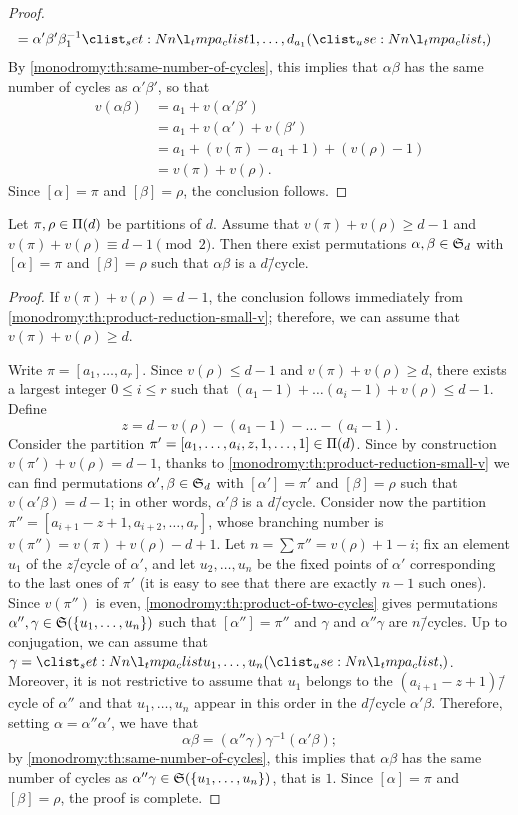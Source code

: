\begin{proof}
\begin{align*}
&=\alpha'\beta'\beta_1^{-1}\cycle{1,\ldots,d_{a_1}}
\end{align*}
By \cref{monodromy:th:same-number-of-cycles}, this implies that $\alpha\beta$ has the same number of cycles as $\alpha'\beta'$, so that
\begin{align*}
v(\alpha\beta)&=a_1+v(\alpha'\beta')\\
&=a_1+v(\alpha')+v(\beta')\\
&=a_1+(v(\pi)-a_1+1)+(v(\rho)-1)\\
&=v(\pi)+v(\rho).
\end{align*}
Since $[\alpha]=\pi$ and $[\beta]=\rho$, the conclusion follows.
\end{proof}

\begin{proposition}\label{monodromy:th:product-reduction-odd}
Let $\pi,\rho\in\Pi(d)$ be partitions of $d$. Assume that $v(\pi)+v(\rho)\ge d-1$ and $v(\pi)+v(\rho)\equiv d-1\pmod{2}$. Then there exist permutations $\alpha,\beta\in\symgroup[d]$ with $[\alpha]=\pi$ and $[\beta]=\rho$ such that $\alpha\beta$ is a $d$\=/cycle.
\end{proposition}
\begin{proof}
If $v(\pi)+v(\rho)=d-1$, the conclusion follows immediately from \cref{monodromy:th:product-reduction-small-v}; therefore, we can assume that $v(\pi)+v(\rho)\ge d$.

Write $\pi=[a_1,\ldots,a_r]$. Since $v(\rho)\le d-1$ and $v(\pi)+v(\rho)\ge d$, there exists a largest integer $0\le i\le r$ such that $(a_1-1)+\ldots(a_i-1)+v(\rho)\le d-1$. Define
\[
z=d-v(\rho)-(a_1-1)-\ldots-(a_i-1).
\]
Consider the partition $\pi'=[a_1,\ldots,a_i,z,1,\ldots,1]\in\Pi(d)$. Since by construction $v(\pi')+v(\rho)=d-1$, thanks to \cref{monodromy:th:product-reduction-small-v} we can find permutations $\alpha',\beta\in\symgroup[d]$ with $[\alpha']=\pi'$ and $[\beta]=\rho$ such that $v(\alpha'\beta)=d-1$; in other words, $\alpha'\beta$ is a $d$\=/cycle. Consider now the partition $\pi''=[a_{i+1}-z+1,a_{i+2},\ldots,a_r]$, whose branching number is $v(\pi'')=v(\pi)+v(\rho)-d+1$. Let $n=\sum\pi''=v(\rho)+1-i$; fix an element $u_1$ of the $z$\=/cycle of $\alpha'$, and let $u_2,\ldots,u_n$ be the fixed points of $\alpha'$ corresponding to the last ones of $\pi'$ (it is easy to see that there are exactly $n-1$ such ones). Since $v(\pi'')$ is even, \cref{monodromy:th:product-of-two-cycles} gives permutations $\alpha'',\gamma\in\symgroup(\{u_1,\ldots,u_n\})$ such that $[\alpha'']=\pi''$ and $\gamma$ and $\alpha''\gamma$ are $n$\=/cycles. Up to conjugation, we can assume that $\gamma=\cycle{u_1,\ldots,u_n}$. Moreover, it is not restrictive to assume that $u_1$ belongs to the $(a_{i+1}-z+1)$\=/cycle of $\alpha''$ and that $u_1,\ldots,u_n$ appear in this order in the $d$\=/cycle $\alpha'\beta$. Therefore, setting $\alpha=\alpha''\alpha'$, we have that
\[
\alpha\beta=(\alpha''\gamma)\gamma^{-1}(\alpha'\beta);
\]
by \cref{monodromy:th:same-number-of-cycles}, this implies that $\alpha\beta$ has the same number of cycles as $\alpha''\gamma\in\symgroup(\{u_1,\ldots,u_n\})$, that is $1$. Since $[\alpha]=\pi$ and $[\beta]=\rho$, the proof is complete.
\end{proof}

